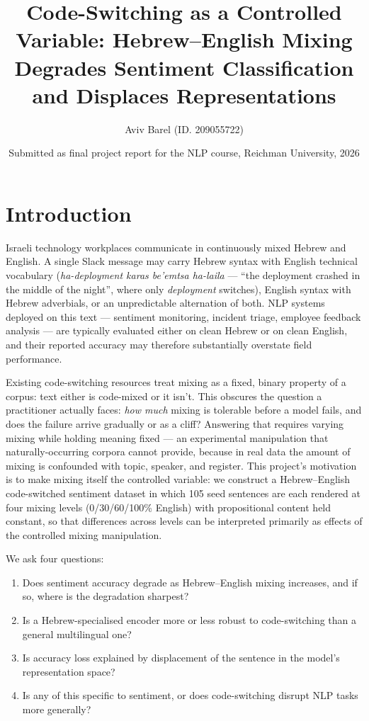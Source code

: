 \documentclass{article}
\title{Code-Switching as a Controlled Variable: Hebrew--English Mixing\\
Degrades Sentiment Classification and Displaces Representations}
\author{Aviv Barel (ID. 209055722)}
\date{Submitted as final project report for the NLP course, Reichman University, 2026}
\begin{document}
\maketitle

\section{Introduction}

Israeli technology workplaces communicate in continuously mixed Hebrew and
English. A single Slack message may carry Hebrew syntax with English
technical vocabulary (\emph{ha-deployment karas be'emtsa ha-laila} --- ``the
deployment crashed in the middle of the night'', where only
\emph{deployment} switches), English syntax with Hebrew adverbials, or an
unpredictable alternation of both. NLP systems deployed on this text ---
sentiment monitoring, incident triage, employee feedback analysis --- are
typically evaluated either on clean Hebrew or on clean English, and their
reported accuracy may therefore substantially overstate field performance.

Existing code-switching resources treat mixing as a fixed, binary property of
a corpus: text either is code-mixed or it isn't. This obscures the question a
practitioner actually faces: \emph{how much} mixing is tolerable before a
model fails, and does the failure arrive gradually or as a cliff? Answering
that requires varying mixing while holding meaning fixed --- an experimental
manipulation that naturally-occurring corpora cannot provide, because in real
data the amount of mixing is confounded with topic, speaker, and register.
This project's motivation is to make mixing itself the controlled variable:
we construct a Hebrew--English code-switched sentiment dataset in which 105
seed sentences are each rendered at four mixing levels (0/30/60/100\%
English) with propositional content held constant, so that differences
across levels can be interpreted primarily as effects of the controlled
mixing manipulation.

We ask four questions:
\begin{enumerate}
  \itemsep0.15em
  \item Does sentiment accuracy degrade as Hebrew--English mixing increases,
        and if so, where is the degradation sharpest?
  \item Is a Hebrew-specialised encoder more or less robust to code-switching
        than a general multilingual one?
  \item Is accuracy loss explained by displacement of the sentence in the
        model's representation space?
  \item Is any of this specific to sentiment, or does code-switching disrupt
        NLP tasks more generally?
\end{enumerate}
\end{document}
